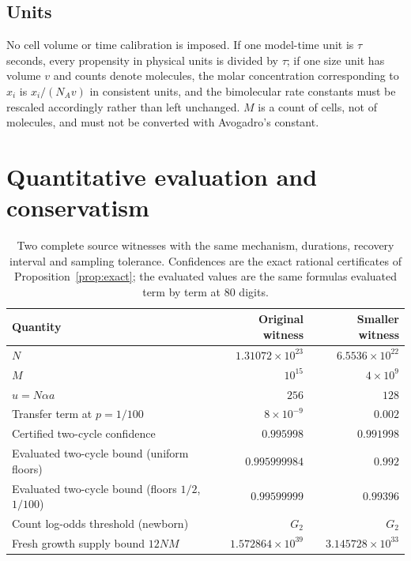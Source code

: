 \documentclass[11pt,a4paper]{article}
\theoremstyle{plain}
\theoremstyle{definition}
\theoremstyle{remark}
\begin{document}
\subsection{Units}
No cell volume or time calibration is imposed. If one model-time unit is $\tau$ seconds, every propensity in physical units is divided by $\tau$; if one size unit has volume $v$ and counts denote molecules, the molar concentration corresponding to $x_i$ is $x_i/(N_Av)$ in consistent units, and the bimolecular rate constants must be rescaled accordingly rather than left unchanged. $M$ is a count of cells, not of molecules, and must not be converted with Avogadro's constant.

\section{Quantitative evaluation and conservatism}\label{sec:numbers}

\begin{table}[tb]
\centering\small
\caption{Two complete source witnesses with the same mechanism, durations, recovery interval and sampling tolerance. Confidences are the exact rational certificates of Proposition~\ref{prop:exact}; the evaluated values are the same formulas evaluated term by term at 80 digits.}
\label{tab:witness}
\begin{tabular}{lrr}
\toprule
Quantity & Original witness & Smaller witness\\
\midrule
$N$ & $1.31072\times10^{23}$ & $6.5536\times10^{22}$\\
$M$ & $10^{15}$ & $4\times10^{9}$\\
$u=N\alpha a$ & $256$ & $128$\\
Transfer term at $p=1/100$ & $8\times10^{-9}$ & $0.002$\\
Certified two-cycle confidence & $0.995998$ & $0.991998$\\
Evaluated two-cycle bound (uniform floors) & $0.995999984$ & $0.992$\\
Evaluated two-cycle bound (floors $1/2$, $1/100$) & $0.99599999$ & $0.99396$\\
Count log-odds threshold (newborn) & $G_2$ & $G_2$\\
Fresh growth supply bound $12NM$ & $1.572864\times10^{39}$ & $3.145728\times10^{33}$\\
\bottomrule
\end{tabular}
\end{table}
\end{document}
